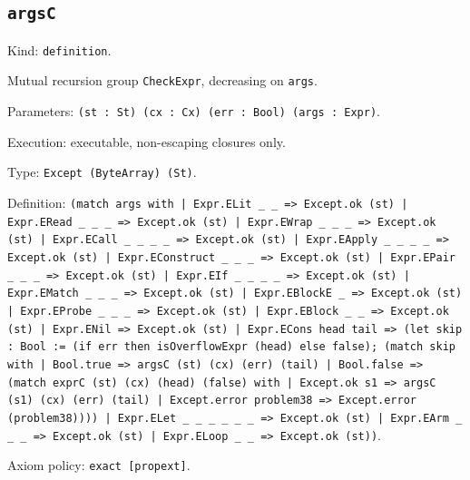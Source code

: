 \documentclass[11pt]{article}
\begin{document}
\subsection*{\texttt{argsC}}
\noindent Kind: \texttt{definition}.\par
\noindent Mutual recursion group \texttt{CheckExpr}, decreasing on \texttt{args}.\par
\noindent Parameters: \texttt{(st : St) (cx : Cx) (err : Bool) (args : Expr)}.\par
\noindent Execution: executable, non-escaping closures only.\par
\noindent Type: \texttt{Except (ByteArray) (St)}.\par
\noindent Definition: \texttt{(match args with | Expr.ELit \_ \_ => Except.ok (st) | Expr.ERead \_ \_ \_ => Except.ok (st) | Expr.EWrap \_ \_ \_ => Except.ok (st) | Expr.ECall \_ \_ \_ \_ => Except.ok (st) | Expr.EApply \_ \_ \_ \_ => Except.ok (st) | Expr.EConstruct \_ \_ \_ => Except.ok (st) | Expr.EPair \_ \_ \_ => Except.ok (st) | Expr.EIf \_ \_ \_ \_ => Except.ok (st) | Expr.EMatch \_ \_ \_ => Except.ok (st) | Expr.EBlockE \_ => Except.ok (st) | Expr.EProbe \_ \_ \_ => Except.ok (st) | Expr.EBlock \_ \_ => Except.ok (st) | Expr.ENil => Except.ok (st) | Expr.ECons head tail => (let skip : Bool := (if err then isOverflowExpr (head) else false); (match skip with | Bool.true => argsC (st) (cx) (err) (tail) | Bool.false => (match exprC (st) (cx) (head) (false) with | Except.ok s1 => argsC (s1) (cx) (err) (tail) | Except.error problem38 => Except.error (problem38)))) | Expr.ELet \_ \_ \_ \_ \_ \_ => Except.ok (st) | Expr.EArm \_ \_ \_ => Except.ok (st) | Expr.ELoop \_ \_ => Except.ok (st))}.\par
\noindent Axiom policy: \texttt{exact [propext]}.\par
\end{document}
